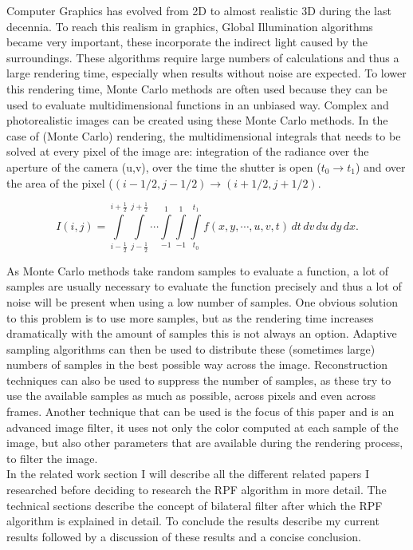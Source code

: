 Computer Graphics has evolved from 2D to almost realistic 3D during the last decennia.
To reach this realism in graphics, Global Illumination algorithms became very important, 
these incorporate the indirect light caused by the surroundings.
These algorithms require large numbers of calculations and thus a large rendering time, especially when results without noise are expected.
To lower this rendering time, Monte Carlo methods are often used because they can be used to evaluate multidimensional functions in an unbiased way.
Complex and photorealistic images can be created using these Monte Carlo methods.
In the case of (Monte Carlo) rendering, the multidimensional integrals that needs to be solved at every pixel of the image are: 
integration of the radiance over the aperture of the camera (u,v), over the time the shutter is open ($t_0 \rightarrow t_1$) and over the area of the pixel ($(i-1/2,j-1/2) \rightarrow (i+1/2,j+1/2)$. 

\[
  I(i,j) = \int\limits_{i-\frac{1}{2}}^{i+\frac{1}{2}} 
		\int\limits_{j-\frac{1}{2}}^{j+\frac{1}{2}} 
		      \cdots
			  \int\limits_{-1}^{1} 
			      \int\limits_{-1}^{1}
				  \int\limits_{t_0}^{t_1} 
				    f(x,y,\cdots,u,v,t)
				  \,dt
			      \,dv
			  \,du
		\,dy
	    \,dx.
\]

As Monte Carlo methods take random samples to evaluate a function, a lot of samples are usually necessary to evaluate the function precisely and 
thus a lot of noise will be present when using a low number of samples. 
One obvious solution to this problem is to use more samples, 
but as the rendering time increases dramatically with the amount of samples this is not always an option.
Adaptive sampling algorithms can then be used to distribute these (sometimes large) numbers of samples in the best possible way across the image.
Reconstruction techniques can also be used to suppress the number of samples, 
as these try to use the available samples as much as possible, across pixels and even across frames.
Another technique that can be used is the focus of this paper and is an advanced image filter, 
it uses not only the color computed at each sample of the image, 
but also other parameters that are available during the rendering process, to filter the image.
\\
In the related work section I will describe all the different related papers I researched before deciding to research the RPF algorithm in more detail.
The technical sections describe the concept of bilateral filter after which the RPF algorithm is explained in detail.
To conclude the results describe my current results followed by a discussion of these results and a concise conclusion.

